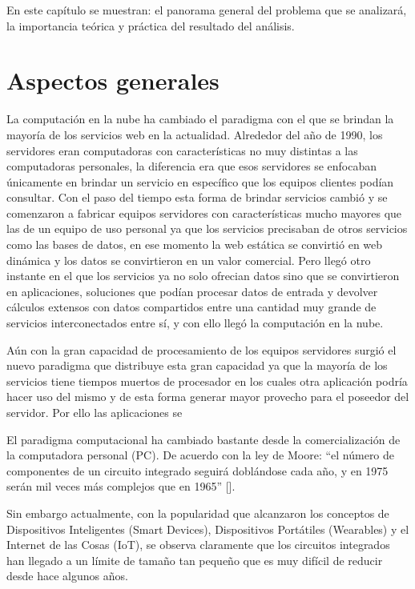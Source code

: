 \documentclass[../main/main.tex]{subfiles}
\begin{document}
\espacio

  En este capítulo se muestran: el panorama general del problema que se analizará, la importancia teórica y práctica del resultado del análisis.

  \section{Aspectos generales}

  La computación en la nube ha cambiado el paradigma con el que se brindan la mayoría de los servicios web en la actualidad. Alrededor del año de 1990, los servidores eran computadoras con características no muy distintas a las computadoras personales, la diferencia era que esos servidores se enfocaban únicamente en brindar un servicio en específico que los equipos clientes podían consultar. Con el paso del tiempo esta forma de brindar servicios cambió y se comenzaron a fabricar equipos servidores con características mucho mayores que las de un equipo de uso personal ya que los servicios precisaban de otros servicios como las bases de datos, en ese momento la web estática se convirtió en web dinámica y los datos se convirtieron en un valor comercial. Pero llegó otro instante en el que los servicios ya no solo ofrecian datos sino que se convirtieron en aplicaciones, soluciones que podían procesar datos de entrada y devolver cálculos extensos con datos compartidos entre una cantidad muy grande de servicios interconectados entre sí, y con ello llegó la computación en la nube.

  Aún con la gran capacidad de procesamiento de los equipos servidores surgió el nuevo paradigma que distribuye esta gran capacidad ya que la mayoría de los servicios tiene tiempos muertos de procesador en los cuales otra aplicación podría hacer uso del mismo y de esta forma generar mayor provecho para el poseedor del servidor. Por ello las aplicaciones se 

  El paradigma computacional ha cambiado bastante desde la comercialización de la computadora personal (PC). De acuerdo con la ley de Moore: ``el número de componentes de un circuito integrado seguirá doblándose cada año, y en 1975 serán mil veces más complejos que en 1965'' [\cite[p.~2]{article:ley_de_moore}].

  Sin embargo actualmente, con la popularidad que alcanzaron los conceptos de Dispositivos Inteligentes (Smart Devices), Dispositivos Portátiles (Wearables) y el Internet de las Cosas (IoT), se observa claramente que los circuitos integrados han llegado a un límite de tamaño tan pequeño que es muy difícil de reducir desde hace algunos años.
\end{document}
